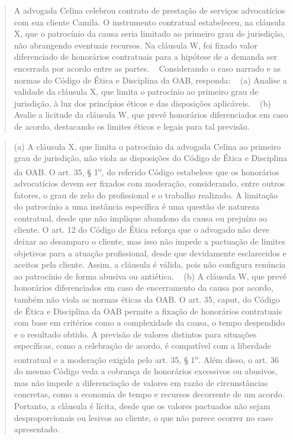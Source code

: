 \documentclass{IOS-Book-Article}
\begin{document}
\begin{quote}\footnotesize\ttfamily\raggedright
A advogada Celina celebrou contrato de prestação de serviços advocatícios com sua cliente Camila. O instrumento contratual estabeleceu, na cláusula X, que o patrocínio da causa seria limitado ao primeiro grau de jurisdição, não abrangendo eventuais recursos. Na cláusula W, foi fixado valor diferenciado de honorários contratuais para a hipótese de a demanda ser encerrada por acordo entre as partes.\newline
~\newline
Considerando o caso narrado e as normas do Código de Ética e Disciplina da OAB, responda:\newline
~\newline
(a) Analise a validade da cláusula X, que limita o patrocínio ao primeiro grau de jurisdição, à luz dos princípios éticos e das disposições aplicáveis.\newline
~\newline
(b) Avalie a licitude da cláusula W, que prevê honorários diferenciados em caso de acordo, destacando os limites éticos e legais para tal previsão.
\end{quote}
\begin{quote}\footnotesize\ttfamily\raggedright
(a) A cláusula X, que limita o patrocínio da advogada Celina ao primeiro grau de jurisdição, não viola as disposições do Código de Ética e Disciplina da OAB. O art. 35, § 1\textsuperscript{o}, do referido Código estabelece que os honorários advocatícios devem ser fixados com moderação, considerando, entre outros fatores, o grau de zelo do profissional e o trabalho realizado. A limitação do patrocínio a uma instância específica é uma questão de natureza contratual, desde que não implique abandono da causa ou prejuízo ao cliente. O art. 12 do Código de Ética reforça que o advogado não deve deixar ao desamparo o cliente, mas isso não impede a pactuação de limites objetivos para a atuação profissional, desde que devidamente esclarecidos e aceitos pela cliente. Assim, a cláusula é válida, pois não configura renúncia ao patrocínio de forma abusiva ou antiética.\newline
~\newline
(b) A cláusula W, que prevê honorários diferenciados em caso de encerramento da causa por acordo, também não viola as normas éticas da OAB. O art. 35, caput, do Código de Ética e Disciplina da OAB permite a fixação de honorários contratuais com base em critérios como a complexidade da causa, o tempo despendido e o resultado obtido. A previsão de valores distintos para situações específicas, como a celebração de acordo, é compatível com a liberdade contratual e a moderação exigida pelo art. 35, § 1\textsuperscript{o}. Além disso, o art. 36 do mesmo Código veda a cobrança de honorários excessivos ou abusivos, mas não impede a diferenciação de valores em razão de circunstâncias concretas, como a economia de tempo e recursos decorrente de um acordo. Portanto, a cláusula é lícita, desde que os valores pactuados não sejam desproporcionais ou lesivos ao cliente, o que não parece ocorrer no caso apresentado.
\end{quote}
\end{document}
